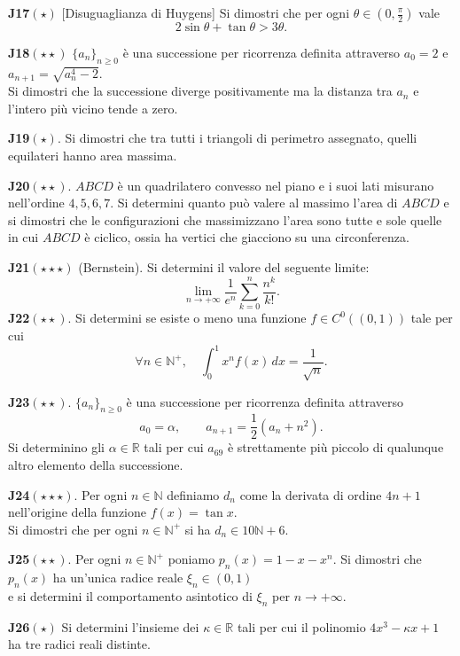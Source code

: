 \documentclass[a4paper,twoside]{article}
\theoremstyle{definition}
\numberwithin{theorem}{section}
\begin{document}
{\label{J17}\textbf{J17}}$(\star)$ [Disuguaglianza di Huygens] Si dimostri che per ogni $\theta\in\left(0,\frac{\pi}{2}\right)$ vale
$$ 2\sin\theta + \tan\theta > 3\theta.$$

\textbf{J18}$(\star\star)$ $\{a_n\}_{n\geq 0}$ è una successione per ricorrenza definita attraverso $a_0=2$ e $a_{n+1}=\sqrt{a_n^4-2}$.\\ Si dimostri che la successione diverge positivamente ma la distanza tra $a_n$ e l'intero più vicino tende a zero.

\textbf{J19}$(\star)$. Si dimostri che tra tutti i triangoli di perimetro assegnato, quelli equilateri hanno area massima. 

\textbf{J20}$(\star\star)$. $ABCD$ è un quadrilatero convesso nel piano e i suoi lati misurano nell'ordine $4,5,6,7$. Si determini quanto può valere al massimo l'area di $ABCD$ e si dimostri che le configurazioni che massimizzano l'area sono tutte e sole quelle in cui $ABCD$ è ciclico, ossia ha vertici che giacciono su una circonferenza.

\textbf{J21}$(\star\star\star)$ (Bernstein). Si determini il valore del seguente limite: 
$$ \lim_{n\to +\infty} \frac{1}{e^n}\sum_{k=0}^{n}\frac{n^k}{k!}.$$
\textbf{J22}$(\star\star)$. Si determini se esiste o meno una funzione $f\in C^0((0,1))$ tale per cui
$$ \forall n\in\mathbb{N}^+,\quad \int_{0}^{1} x^n f(x)\,dx = \frac{1}{\sqrt{n}}. $$

\textbf{J23}$(\star\star)$. $\{a_n\}_{n\geq 0}$ è una successione per ricorrenza definita attraverso
$$ a_0=\alpha,\qquad a_{n+1} = \frac{1}{2}\left(a_n+n^2\right).$$
Si determinino gli $\alpha\in\mathbb{R}$ tali per cui $a_{69}$ è strettamente più piccolo di qualunque altro elemento della successione. 

\textbf{J24}$(\star\star\star)$. Per ogni $n\in\mathbb{N}$ definiamo $d_n$ come la derivata di ordine $4n+1$ nell'origine della funzione $f(x)=\tan x$.\\ Si dimostri che per ogni $n\in\mathbb{N}^+$ si ha $d_n \in 10\mathbb{N}+6$.

\textbf{J25}$(\star\star)$. Per ogni $n\in\mathbb{N}^+$ poniamo $p_n(x)=1-x-x^n$. Si dimostri che $p_n(x)$ ha un'unica radice reale $\xi_n\in (0,1)$\\ e si determini il comportamento asintotico di $\xi_n$ per $n\to +\infty$. 

\textbf{J26}$(\star)$ Si determini l'insieme dei $\kappa\in\mathbb{R}$ tali per cui il polinomio $4x^3-\kappa x+1$ ha tre radici reali distinte.
\end{document}
